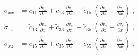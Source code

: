 \begin{itemize}
\begin{subequations}
\begin{align}
            \dot{\sigma}_{xx} &= \tilde{c}_{11}\,\frac{\partial v_x}{\partial x} + \tilde{c}_{13}\,\frac{\partial v_z}{\partial z}\ + \tilde{c}_{15}\,\left(\frac{\partial v_x}{\partial z} + \frac{\partial v_z}{\partial x}\right)\;,\\
            \dot{\sigma}_{zz} &= \tilde{c}_{13}\,\frac{\partial v_x}{\partial x} + \tilde{c}_{33}\,\frac{\partial v_z}{\partial z}\ + \tilde{c}_{35}\,\left(\frac{\partial v_x}{\partial z} + \frac{\partial v_z}{\partial x}\right)\;,\\
            \dot{\sigma}_{xz} &= \tilde{c}_{15}\,\frac{\partial v_x}{\partial x} + \tilde{c}_{35}\,\frac{\partial v_z}{\partial z}\ + \tilde{c}_{55}\,\left(\frac{\partial v_x}{\partial z} + \frac{\partial v_z}{\partial x}\right)\;.
            \label{eq:tti_elastic} 
            \end{align}
        \end{subequations}
\end{itemize}


